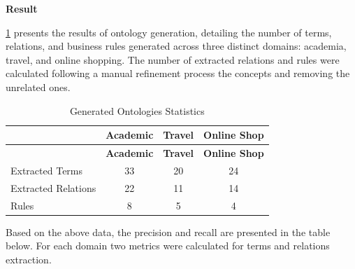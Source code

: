 \textbf{Result}

\cref{tbl:eval.generated-ontologies} presents the results of ontology generation, detailing the
number of terms, relations, and business rules generated across three
distinct domains: academia, travel, and online shopping. The number of
extracted relations and rules were calculated following a manual
refinement process the concepts and removing the unrelated ones.

\hypertarget{tbl:eval.generated-ontologies}{}
\begin{longtable}{@{}lccc@{}}
\caption{\label{tbl:eval.generated-ontologies}Generated Ontologies Statistics}\tabularnewline
\toprule
\begin{minipage}[b]{0.32\columnwidth}\raggedright
\end{minipage} & 
\begin{minipage}[b]{0.22\columnwidth}\centering
\textbf{Academic}\strut
\end{minipage} & 
\begin{minipage}[b]{0.22\columnwidth}\centering
\textbf{Travel}\strut
\end{minipage} & 
\begin{minipage}[b]{0.24\columnwidth}\centering
\textbf{Online Shop}\strut
\end{minipage} \tabularnewline
\midrule
\endfirsthead

\toprule
\begin{minipage}[b]{0.32\columnwidth}\raggedright
\end{minipage} & 
\begin{minipage}[b]{0.22\columnwidth}\centering
\textbf{Academic}\strut
\end{minipage} & 
\begin{minipage}[b]{0.22\columnwidth}\centering
\textbf{Travel}\strut
\end{minipage} & 
\begin{minipage}[b]{0.24\columnwidth}\centering
\textbf{Online Shop}\strut
\end{minipage} \tabularnewline
\midrule
\endhead

Extracted Terms & 33 & 20 & 24 \tabularnewline
Extracted Relations & 22 & 11 & 14 \tabularnewline
Rules & 8 & 5 & 4 \tabularnewline

\bottomrule
\end{longtable}

Based on the above data, the  precision and recall are presented in the table below. For each domain two metrics were calculated for terms and relations extraction. 

